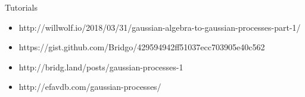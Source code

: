 \documentclass[a4paper]{article}
\begin{document}
Tutorials

\begin{itemize}
	\item http://willwolf.io/2018/03/31/gaussian-algebra-to-gaussian-processes-part-1/
	\item https://gist.github.com/Bridgo/429594942ff51037ecc703905e40c562
	\item http://bridg.land/posts/gaussian-processes-1
	\item http://efavdb.com/gaussian-processes/
\end{itemize}


\end{document}
